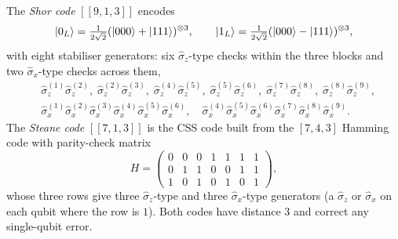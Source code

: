 \begin{statement}
\label{stmt:css}
The \emph{Shor code} $[[9,1,3]]$ encodes
\begin{equation}
\ket{0_L}=\tfrac{1}{2\sqrt2}(\ket{000}+\ket{111})^{\otimes3},
\qquad
\ket{1_L}=\tfrac{1}{2\sqrt2}(\ket{000}-\ket{111})^{\otimes3},
\end{equation}
with eight stabiliser generators: six $\hat\sigma_z$-type checks within
the three blocks and two $\hat\sigma_x$-type checks across them,
\begin{equation}
\begin{aligned}
&\hat\sigma_z^{(1)}\hat\sigma_z^{(2)},\;
\hat\sigma_z^{(2)}\hat\sigma_z^{(3)},\;
\hat\sigma_z^{(4)}\hat\sigma_z^{(5)},\;
\hat\sigma_z^{(5)}\hat\sigma_z^{(6)},\;
\hat\sigma_z^{(7)}\hat\sigma_z^{(8)},\;
\hat\sigma_z^{(8)}\hat\sigma_z^{(9)},\\
&\hat\sigma_x^{(1)}\hat\sigma_x^{(2)}\hat\sigma_x^{(3)}
\hat\sigma_x^{(4)}\hat\sigma_x^{(5)}\hat\sigma_x^{(6)},\quad
\hat\sigma_x^{(4)}\hat\sigma_x^{(5)}\hat\sigma_x^{(6)}
\hat\sigma_x^{(7)}\hat\sigma_x^{(8)}\hat\sigma_x^{(9)}.
\end{aligned}
\end{equation}
The \emph{Steane code} $[[7,1,3]]$ is the CSS code built from the
$[7,4,3]$ Hamming code with parity-check matrix
\begin{equation}
\label{eq:hamming}
H=\begin{pmatrix}
0&0&0&1&1&1&1\\
0&1&1&0&0&1&1\\
1&0&1&0&1&0&1
\end{pmatrix},
\end{equation}
whose three rows give three $\hat\sigma_z$-type and three
$\hat\sigma_x$-type generators (a $\hat\sigma_z$ or $\hat\sigma_x$ on
each qubit where the row is $1$). Both codes have distance $3$ and
correct any single-qubit error.
\end{statement}

